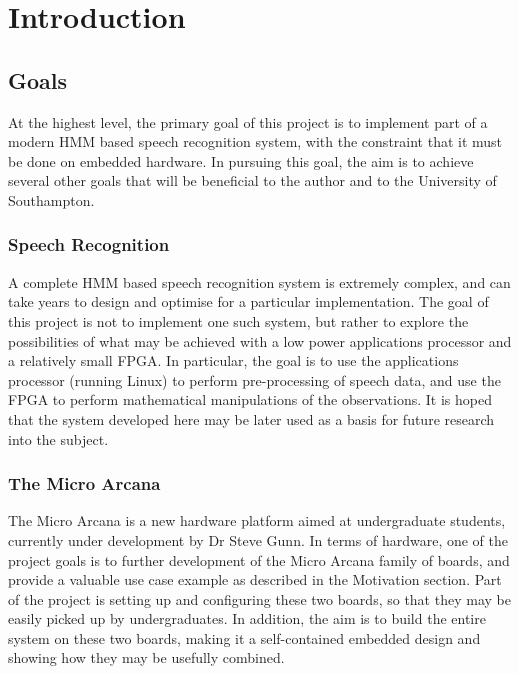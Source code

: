 \chapter{Introduction} %
\label{cha:introduction}


\section{Goals} %
\label{sec:goals}
	At the highest level, the primary goal of this project is to implement part of a modern HMM based speech recognition system, with the constraint that it must be done on embedded hardware.  In pursuing this goal, the aim is to achieve several other goals that will be beneficial to the author and to the University of Southampton.

	\subsection{Speech Recognition} %
	\label{sec:speech_recognition}
		A complete HMM based speech recognition system is extremely complex, and can take years to design and optimise for a particular implementation.  The goal of this project is not to implement one such system, but rather to explore the possibilities of what may be achieved with a low power applications processor and a relatively small FPGA.  In particular, the goal is to use the applications processor (running Linux) to perform pre-processing of speech data, and use the FPGA to perform mathematical manipulations of the observations.  It is hoped that the system developed here may be later used as a basis for future research into the subject.

	\subsection{The Micro Arcana} %
	\label{sec:the_micro_arcana}
		The Micro Arcana is a new hardware platform aimed at undergraduate students, currently under development by Dr Steve Gunn.  
		In terms of hardware, one of the project goals is to further development of the Micro Arcana family of boards, and provide a valuable use case example as described in the Motivation section.  Part of the project is setting up and configuring these two boards, so that they may be easily picked up by undergraduates.  In addition, the aim is to build the entire system on these two boards, making it a self-contained embedded design and showing how they may be usefully combined.

